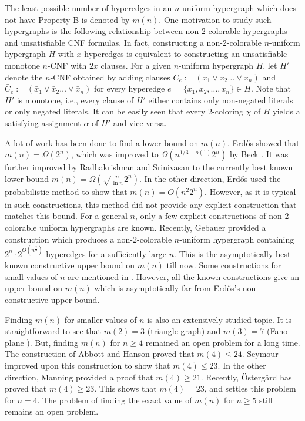 \documentclass[11pt]{article}
\begin{document}
The least possible number of hyperedges in an $n$-uniform hypergraph which does not have Property B is denoted by $m(n)$. One motivation to study such hypergraphs is the following relationship between non-$2$-colorable hypergraphs and unsatisfiable CNF formulas. In fact, constructing a non-$2$-colorable $n$-uniform hypergraph $H$ with $x$ hyperedges is equivalent to constructing an unsatisfiable monotone $n$-CNF with $2x$ clauses. For a given $n$-uniform hypergraph $H$, let $H'$ denote the $n$-CNF obtained by adding clauses $C_{e}:= (x_{1} \vee x_{2} \dots \vee x_{n})$ and $\bar C_{e}:= (\bar x_{1} \vee \bar x_{2} \dots \vee \bar x_{n})$ for every hyperedge $e$ = $\{x_{1},x_{2}, \dots,x_{n}\} \in H$. Note that $H'$ is monotone, i.e., every clause of $H'$ either contains only non-negated literals or only negated literals. It can be easily seen that every $2$-coloring $\chi$ of $H$ yields a satisfying assignment $\alpha$ of $H'$ and vice versa.


A lot of work has been done to find a lower bound on $m(n)$. Erd\H{o}s \cite{erdos1} showed that $m(n) = \Omega({2^n})$, which was improved to $\Omega({n^{1/3 - o(1)} 2^n})$ by Beck \cite{beck}. It was further improved by  Radhakrishnan and Srinivasan \cite{radhakrishnan} to the currently best known lower bound $m(n)=\Omega({\sqrt{\frac{n}{\ln n}} 2^n})$. In the other direction, Erd\H{o}s \cite{erdos} used the probabilistic method to show that $m(n) = O(n^2 2^n)$. However, as it is typical in such constructions, this method did not provide any explicit construction that matches this bound. For a general $n$, only a few explicit constructions of non-2-colorable uniform hypergraphs are known. Recently, Gebauer \cite{geba} provided a construction which produces a non-$2$-colorable $n$-uniform hypergraph containing $2^n \cdot 2^{O(n^{\frac{2}{3}})}$ hyperedges for a sufficiently large $n$. This is the asymptotically best-known  constructive upper bound on $m(n)$ till now. Some constructions for small values of $n$ are mentioned in \cite{toft}. However, all the known constructions give an upper bound on $m(n)$ which is asymptotically far from Erd\H{o}s's non-constructive upper bound. 



Finding $m(n)$ for smaller values of $n$ is also an extensively studied topic. It is straightforward to see that $m(2) = 3$ (triangle graph) and $m(3) = 7$ (Fano plane \cite{klein}). But, finding $m(n)$ for $n\geq 4$ remained an open problem for a long time. The construction of Abbott and Hanson \cite{Abbott} proved that $m(4) \leq  24$. Seymour \cite{seymour} improved upon this construction to show that $m(4) \leq  23$. In the other direction, Manning \cite{manning} provided a proof that $m(4) \geq  21$. Recently, \"{O}sterg\r{a}rd \cite{patric} has proved that $m(4) \geq 23$. 
This shows that $m(4) = 23$, and settles this problem for $n = 4$. The problem of finding the exact value of $m(n)$ for $n\geq 5$ still remains an open problem.
\end{document}
